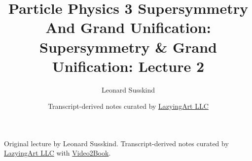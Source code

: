 \documentclass[11pt,oneside]{book}
\begin{document}
\frontmatter
\title{Particle Physics 3 Supersymmetry And Grand Unification: Supersymmetry \& Grand Unification: Lecture 2}
\author{Leonard Susskind}
\date{Transcript-derived notes curated by \href{https://lazying.art}{LazyingArt LLC}}
\maketitle
\begin{center}
\small Original lecture by Leonard Susskind. Transcript-derived notes curated by \href{https://lazying.art}{LazyingArt LLC} with \href{https://github.com/lachlanchen/Video2Book}{Video2Book}.
\end{center}
\clearpage
\mainmatter

\end{document}
